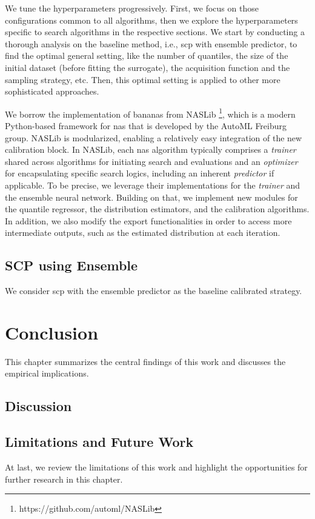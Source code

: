 \documentclass[a4paper,oneside,bibliography=totoc]{scrbook}
\begin{document}
We tune the hyperparameters progressively. First, we focus on those configurations common to all algorithms, then we explore the hyperparameters specific to search algorithms in the respective sections. We start by conducting a thorough analysis on the baseline method, i.e., \gls{scp} with ensemble predictor, to find the optimal general setting, like the number of quantiles, the size of the initial dataset (before fitting the surrogate), the acquisition function and the sampling strategy, etc. Then, this optimal setting is applied to other more sophisticated approaches.

We borrow the implementation of \gls{bananas} from NASLib \footnote{https://github.com/automl/NASLib}, which is a modern Python-based framework for \gls{nas} that is developed by the AutoML Freiburg group. NASLib is modularized, enabling a relatively easy integration of the new calibration block. In NASLib, each \gls{nas} algorithm typically comprises a \textit{trainer} shared across algorithms for initiating search and evaluations and an \textit{optimizer} for encapsulating specific search logics, including an inherent \textit{predictor} if applicable. To be precise, we leverage their implementations for the \textit{trainer} and the ensemble neural network. Building on that, we implement new modules for the quantile regressor, the distribution estimators, and the calibration algorithms. In addition, we also modify the export functionalities in order to access more intermediate outputs, such as the estimated distribution at each iteration.

\section{SCP using Ensemble}
We consider \gls{scp} with the ensemble predictor as the baseline calibrated strategy. 


\chapter{Conclusion}
This chapter summarizes the central findings of this work and discusses the empirical implications.

\section{Discussion}
\label{sec: discussin}

\section{Limitations and Future Work}
At last, we review the limitations of this work and highlight the opportunities for further research in this chapter.
\end{document}
